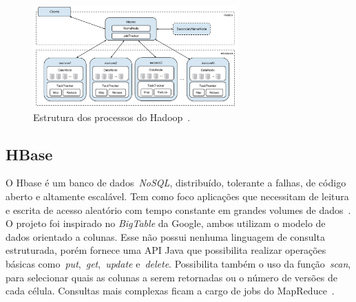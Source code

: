 \documentclass[12pt]{article}
\begin{document}
\begin{figure}[!ht]
\centering
\includegraphics[width=0.7\textwidth]{images/hadoop.png}
\caption{Estrutura dos processos do Hadoop~\cite{goldman2012apache}.}
\label{figure:hadoop}
\end{figure}




\subsection{HBase}
\label{subsec:hbase}

O Hbase é um banco de dados~\textit{NoSQL}, distribuído, tolerante a falhas, de código aberto e altamente escalável. Tem como foco aplicações que necessitam de leitura e escrita de acesso aleatório com tempo constante em grandes volumes de dados~\cite{hadoophbase}. O projeto foi inspirado no \textit{BigTable} da Google, ambos utilizam o modelo de dados orientado a colunas. Esse não possui nenhuma linguagem de consulta estruturada, porém fornece uma API Java que possibilita realizar operações básicas como~\emph{put},~\emph{get},~\emph{update} e~\emph{delete}. Possibilita também o uso da função~\emph{scan}, para selecionar quais as colunas a serem retornadas ou o número de versões de cada célula. Consultas mais complexas ficam a cargo de jobs do MapReduce~\cite{cunha2015column}.
\end{document}
